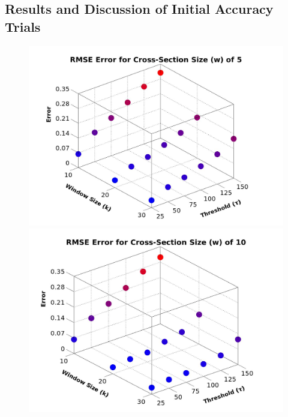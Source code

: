 \subsection{Results and Discussion of Initial Accuracy Trials}
\label{section:DrillAccuracyResultsAndDiscussion}

\begin{figure}
\begin{center}
  \begin{minipage}{0.49\linewidth}
     \includegraphics[height=0.25\textheight,width=0.99\linewidth]{images/RMSE_Graph_CS5.jpg} 

     \includegraphics[height=0.25\textheight,width=0.99\linewidth]{images/RMSE_Graph_CS10.jpg}


\end{minipage}
\end{center}
\end{figure}
